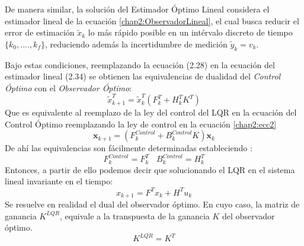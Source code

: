 \documentclass[10pt]{report}
\numberwithin{equation}{chapter}
\numberwithin{algorithm}{chapter}
\newcommand{\vect}[1]{\boldsymbol{#1}}
\begin{document}
De manera similar, la solución del Estimador Óptimo Lineal considera el estimador lineal de la ecuación \eqref{chap2:ObservadorLineal}, el cual busca reducir el error de estimación $\tilde{x}_k$ lo más rápido posible en un intérvalo discreto de tiempo $\{k_0,....,k_f\}$, reduciendo además la incertidumbre de medición $\tilde{y}_k=v_k$.\par
Bajo estas condiciones, reemplazando la ecuación (2.28) en la ecuación del estimador lineal (2.34) se obtienen las equivalencias de dualidad del \emph{Control Óptimo} con el \textsl{Observador Óptimo}:
\begin{equation}\label{filtro_ecc7}
\tilde{x}_{k+1}^T=\tilde{x}_{k}^T(F_k^T +H_k^TK^T)
\end{equation}
Que es equivalente al reemplazo de la ley del control del LQR en la ecuación del Control Óptimo reemplazando la ley de control en la ecuación \eqref{chap2:ecc2}
\begin{equation}\label{filtro_ecc8}
\vect{x}_{k+1}=(F_k^{Control}+B^{Control}_kK)\vect{x}_{k}
\end{equation}
De ahí las equivalencias son fácilmente determinadas estableciendo :
\begin{equation}\label{chap2:EcuacionesDual}
F_k^{Control}=F_k^T ~~~~B^{Control}_k=H_k^T
\end{equation}
Entonces, a partir de ello podemos decir que solucionando el LQR en el sistema lineal invariante en el tiempo:
\begin{equation}\label{chap2:ecc13}
x_{k+1}=F^Tx_k+H^Tu_k
\end{equation}
Se resuelve en realidad el dual del observador óptimo. En cuyo caso, la matriz de ganancia $K^{LQR}$, equivale a la transpuesta de la ganancia $K$ del observador óptimo.
\begin{equation}
K^{LQR}=K^T
\end{equation}
\end{document}
